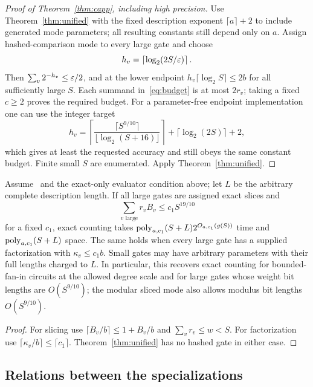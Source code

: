 \begin{proof}[Proof of Theorem~\ref{thm:capp}, including high precision]
Use Theorem~\ref{thm:unified} with the fixed description exponent
$\lceil a\rceil+2$ to include generated mode parameters; all resulting
constants still depend only on $a$.
Assign hashed-comparison mode to every large gate and choose
\[
 h_v=\left\lceil\log_2(2S/\varepsilon)\right\rceil.
\]
Then $\sum_v2^{-h_v}\le\varepsilon/2$, and at the lower endpoint
$h_v\lceil\log_2S\rceil\le2b$ for all sufficiently large $S$.
Each summand in~\eqref{eq:budget} is at most $2r_v$; taking a fixed
$c\ge2$ proves the required budget. For a parameter-free endpoint
implementation one can use the integer target
\[
 h_v=\left\lceil\frac{\lceil S^{9/10}\rceil}
 {\lfloor\log_2(S+16)\rfloor}\right\rceil
 +\lceil\log_2(2S)\rceil+2,
\]
which gives at least the requested accuracy and still obeys the same
constant budget. Finite small $S$ are enumerated. Apply
Theorem~\ref{thm:unified}.
\end{proof}

\begin{corollary}
\label{cor:exact}
Assume \HTC\ and the exact-only evaluator condition above; let $L$ be
the arbitrary complete description length.
If all large gates are assigned exact slices and
\[
 \sum_{v\text{ large}}r_vB_v\le c_1S^{19/10}
\]
for a fixed $c_1$, exact counting takes
$\operatorname{poly}_{a,c_1}(S+L)2^{O_{a,c_1}(g(S))}$ time and
$\operatorname{poly}_{a,c_1}(S+L)$ space.
The same holds when every large gate has a supplied factorization
with $\kappa_v\le c_1b$. Small gates may have arbitrary parameters
with their full lengths charged to $L$. In particular, this recovers exact
counting for bounded-fan-in circuits at the allowed degree scale and
for large gates whose weight bit lengths are $O(S^{9/10})$; the
modular sliced mode also allows modulus bit lengths $O(S^{9/10})$.
\end{corollary}
\begin{proof}
For slicing use
$\lceil B_v/b\rceil\le1+B_v/b$ and $\sum_vr_v\le w<S$.
For factorization use
$\lceil\kappa_v/b\rceil\le\lceil c_1\rceil$.
Theorem~\ref{thm:unified} has no hashed gate in either case.
\end{proof}

\subsection{Relations between the specializations}

